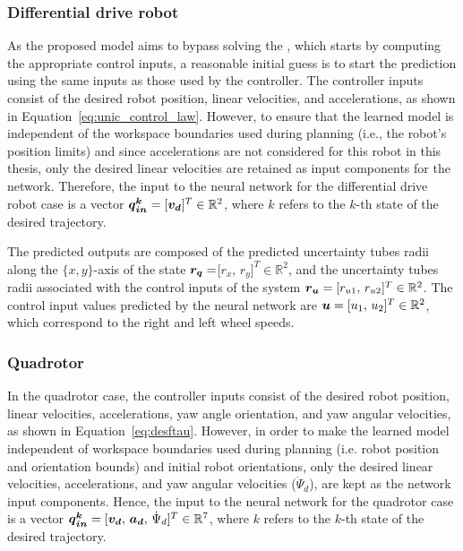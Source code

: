 \subsubsection{Differential drive robot}\label{sec:unic_nn_architecture}

As the proposed model aims to bypass solving the , which starts by computing the appropriate control inputs, a reasonable initial guess is to start the prediction using the same inputs as those used by the controller.
The  controller inputs consist of the desired robot position, linear velocities, and accelerations, as shown in Equation~\ref{eq:unic_control_law}. 
However, to ensure that the learned model is independent of the workspace boundaries used during planning (i.e., the robot's position limits) and since accelerations are not considered for this robot in this thesis, only the desired linear velocities are retained as input components for the network.
Therefore, the input to the neural network for the differential drive robot case is a vector $\boldsymbol{\boldsymbol{q}_{in}^k} = [\boldsymbol{v_d}]^T \in \mathbb{R}^2$, where $k$ refers to the $k$-th state of the desired trajectory.

The predicted outputs are composed of the predicted uncertainty tubes radii along the $\{x,y\}$-axis of the state $\boldsymbol{r_q}=$[$r_{x},\,r_{y}]^T \in \mathbb{R}^2$, and the uncertainty tubes radii associated with the control inputs of the system $\boldsymbol{r_u} = [r_{u1},\,r_{u2}]^T \in \mathbb{R}^2$.
The control input values predicted by the neural network are $\boldsymbol{u} = [u_1 ,\, u_2]^T \in \mathbb{R}^2$, which correspond to the right and left wheel speeds.

\subsubsection{Quadrotor}\label{sec:quad_nn_architecture}

In the quadrotor case, the controller inputs consist of the desired robot position, linear velocities, accelerations, yaw angle orientation, and yaw angular velocities, as shown in Equation~\ref{eq:desftau}. 
However, in order to make the learned model independent of workspace boundaries used during planning (i.e. robot position and orientation bounds) and initial robot orientations, only the desired linear velocities, accelerations, and yaw angular velocities ($\Dot{\Psi}_d$), are kept as the network input components.
Hence, the input to the neural network for the quadrotor case is a vector $\boldsymbol{\boldsymbol{q}_{in}^k} = [\boldsymbol{v_d} ,\, \boldsymbol{a_d} ,\, \Dot{\Psi}_d]^T \in \mathbb{R}^7$, where $k$ refers to the $k$-th state of the desired trajectory.

